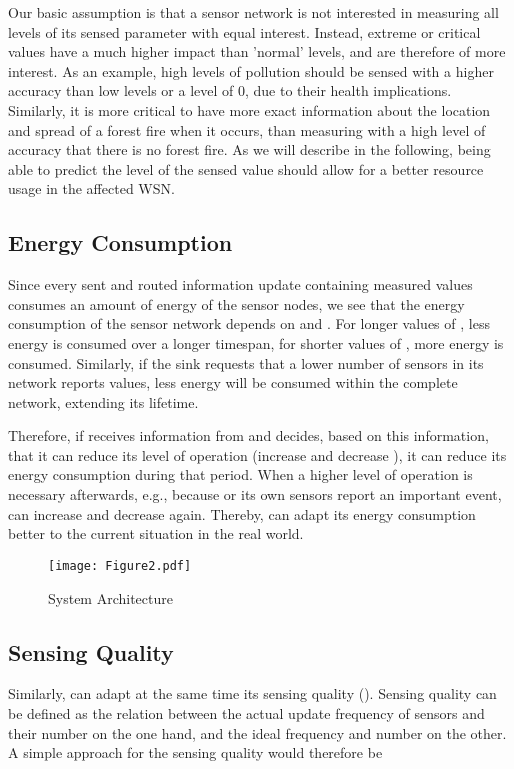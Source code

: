 \documentclass[onecolumn]{jaise2e}
\begin{document}
Our basic assumption is that a sensor network is not interested in measuring all levels of its sensed parameter with equal interest. Instead, extreme or critical values have a much higher impact than 'normal' levels, and are therefore of more interest. As an example, high levels of pollution should be sensed with a higher accuracy than low levels or a level of 0, due to their health implications. Similarly, it is more critical to have more exact information about the location and spread of a forest fire when it occurs, than measuring with a high level of accuracy that there is no forest fire. As we will describe in the following, being able to predict the level of the sensed value should allow for a better resource usage in the affected WSN.

\subsection{Energy Consumption}

Since every sent and routed information update containing measured values consumes an amount of energy of the sensor nodes, we see that the energy consumption of the sensor network depends on  and . For longer values of , less energy is consumed over a longer timespan, for shorter values of , more energy is consumed. Similarly, if the sink requests that a lower number of sensors  in its network reports values, less energy will be consumed within the complete network, extending its lifetime.

Therefore, if  receives information from  and decides, based on this information, that it can reduce its level of operation (increase  and decrease ), it can reduce its energy consumption during that period. When a higher level of operation is necessary afterwards, e.g., because  or its own sensors report an important event,  can increase  and decrease  again. Thereby,  can adapt its energy consumption better to the current situation in the real world.

\begin{figure*}[!th]
\centering
\texttt{[image: Figure2.pdf]}  
\caption{System Architecture}
\label{fig:System_Architecture}
\end{figure*}


\subsection{Sensing Quality}

Similarly,  can adapt at the same time its sensing quality (). Sensing quality can be defined as the relation between the actual update frequency of sensors  and their number  on the one hand, and the ideal frequency  and number  on the other. A simple approach for the sensing quality would therefore be
\end{document}
